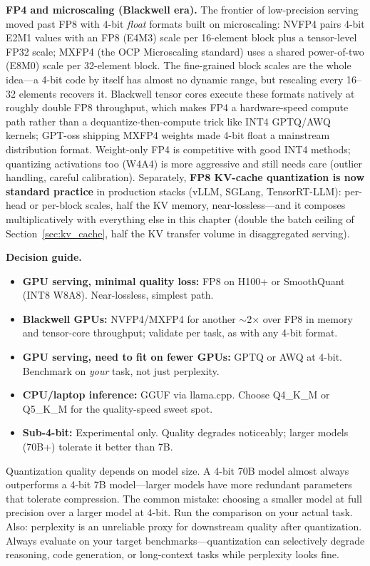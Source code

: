 \textbf{FP4 and microscaling (Blackwell era).} The frontier of low-precision serving moved past FP8 with 4-bit \textit{float} formats built on microscaling: NVFP4 pairs 4-bit E2M1 values with an FP8 (E4M3) scale per 16-element block plus a tensor-level FP32 scale; MXFP4 (the OCP Microscaling standard) uses a shared power-of-two (E8M0) scale per 32-element block. The fine-grained block scales are the whole idea---a 4-bit code by itself has almost no dynamic range, but rescaling every 16--32 elements recovers it. Blackwell tensor cores execute these formats natively at roughly double FP8 throughput, which makes FP4 a hardware-speed compute path rather than a dequantize-then-compute trick like INT4 GPTQ/AWQ kernels; GPT-oss shipping MXFP4 weights made 4-bit float a mainstream distribution format. Weight-only FP4 is competitive with good INT4 methods; quantizing activations too (W4A4) is more aggressive and still needs care (outlier handling, careful calibration). Separately, \textbf{FP8 KV-cache quantization is now standard practice} in production stacks (vLLM, SGLang, TensorRT-LLM): per-head or per-block scales, half the KV memory, near-lossless---and it composes multiplicatively with everything else in this chapter (double the batch ceiling of Section~\ref{sec:kv_cache}, half the KV transfer volume in disaggregated serving).

\textbf{Decision guide.}
\begin{itemize}
    \item \textbf{GPU serving, minimal quality loss:} FP8 on H100+ or SmoothQuant (INT8 W8A8). Near-lossless, simplest path.
    \item \textbf{Blackwell GPUs:} NVFP4/MXFP4 for another $\sim$2$\times$ over FP8 in memory and tensor-core throughput; validate per task, as with any 4-bit format.
    \item \textbf{GPU serving, need to fit on fewer GPUs:} GPTQ or AWQ at 4-bit. Benchmark on \textit{your} task, not just perplexity.
    \item \textbf{CPU/laptop inference:} GGUF via llama.cpp. Choose Q4\_K\_M or Q5\_K\_M for the quality-speed sweet spot.
    \item \textbf{Sub-4-bit:} Experimental only. Quality degrades noticeably; larger models (70B+) tolerate it better than 7B.
\end{itemize}

\begin{warningbox}
Quantization quality depends on model size. A 4-bit 70B model almost always outperforms a 4-bit 7B model---larger models have more redundant parameters that tolerate compression. The common mistake: choosing a smaller model at full precision over a larger model at 4-bit. Run the comparison on your actual task. Also: perplexity is an unreliable proxy for downstream quality after quantization. Always evaluate on your target benchmarks---quantization can selectively degrade reasoning, code generation, or long-context tasks while perplexity looks fine.
\end{warningbox}

